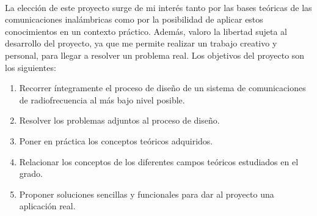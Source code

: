 %
\paragraph{}
La elección de este proyecto surge de mi interés tanto por las bases teóricas de las comunicaciones inalámbricas como por la posibilidad de aplicar estos conocimientos en un contexto práctico. 
Además, valoro la libertad sujeta al desarrollo del proyecto, ya que me permite realizar un trabajo creativo y personal, para llegar a resolver un problema real.
Los objetivos del proyecto son los siguientes:
\begin{enumerate}
\item Recorrer \'integramente el proceso de diseño de un sistema de comunicaciones de radiofrecuencia al más bajo nivel posible.
\item Resolver los problemas adjuntos al proceso de diseño.
\item Poner en práctica los conceptos teóricos adquiridos.
\item Relacionar los conceptos de los diferentes campos te\'oricos estudiados en el grado.
\item Proponer soluciones sencillas y funcionales para dar al proyecto una aplicaci\'on real.
\end{enumerate}
